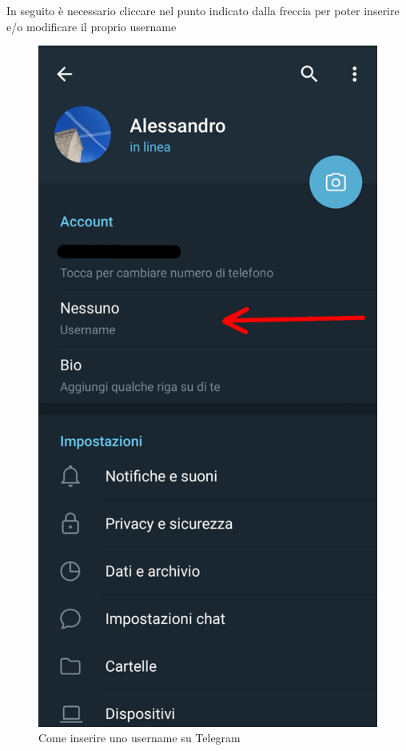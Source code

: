 		\newpage
		In seguito è necessario cliccare nel punto indicato dalla freccia per poter inserire e/o modificare il proprio username
		\begin{figure}[H]
			\centering
			\includegraphics[scale=0.110]{res/images/telegram2.jpg}
			\caption{Come inserire uno username su Telegram}
			\label{Screenshot2}
		\end{figure}
